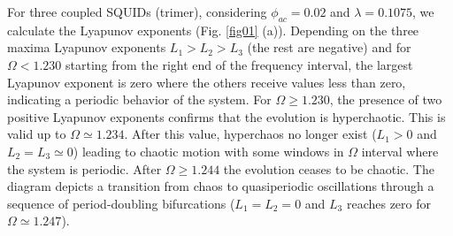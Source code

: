 \documentclass[aps,pre,reprint,groupedaddress]{revtex4-1}
\begin{document}
For three coupled SQUIDs (trimer), considering $\phi_{ac} = 0.02$ and $\lambda = 0.1075$,  we calculate the Lyapunov exponents (Fig. \ref{fig01} (a)). Depending on the three maxima Lyapunov exponents $L_{1}>L_{2}>L_{3}$ (the rest are negative) and for $\Omega < 1.230$ starting from the right end of the frequency interval, the largest Lyapunov exponent is zero where the others receive values less than zero, indicating a periodic behavior of the system. For $\Omega \geq 1.230$, the presence of two positive Lyapunov exponents confirms that the evolution is hyperchaotic. This is valid up to $\Omega \simeq 1.234$. After this value, hyperchaos no longer exist ($L_{1}>0$ and $L_{2} = L_{3} \simeq 0$) leading to chaotic motion with some windows in $\Omega$ interval where the system is periodic. After $\Omega \geq 1.244$ the evolution ceases to be chaotic. The diagram depicts a transition from chaos to quasiperiodic oscillations through a sequence of period-doubling bifurcations ($L_{1} =L_{2} = 0$ and $L_{3}$ reaches zero for $\Omega \simeq 1.247$).
      
\end{document}
